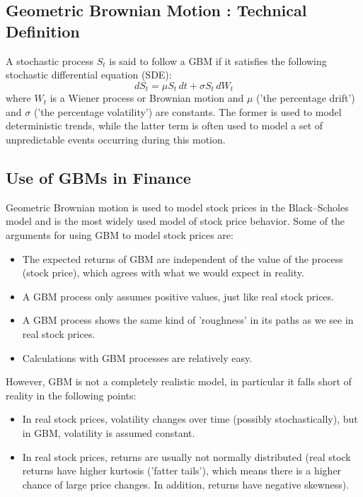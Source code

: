 \documentclass[12pt]{article}
\begin{document}
\subsection{Geometric Brownian Motion : Technical Definition}
A stochastic process $S_t$ is said to follow a GBM if it satisfies the following stochastic differential equation (SDE):
 \[dS_t = \mu S_t\,dt + \sigma S_t\,dW_t \]
where  $W_t$  is a Wiener process or Brownian motion and  $\mu$  ('the percentage drift') and  $\sigma$  ('the percentage volatility') are constants. The former is used to model deterministic trends, while the latter term is often used to model a set of unpredictable events occurring during this motion.
\subsection{Use of GBMs in Finance}
Geometric Brownian motion is used to model stock prices in the Black–Scholes model and is the most widely used model of stock price behavior.
Some of the arguments for using GBM to model stock prices are:
\begin{itemize}
\item The expected returns of GBM are independent of the value of the process (stock price), which agrees with what we would expect in reality.
\item A GBM process only assumes positive values, just like real stock prices.
\item A GBM process shows the same kind of 'roughness' in its paths as we see in real stock prices.
\item Calculations with GBM processes are relatively easy.
\end{itemize}

However, GBM is not a completely realistic model, in particular it falls short of reality in the following points:

\begin{itemize}
\item In real stock prices, volatility changes over time (possibly stochastically), but in GBM, volatility is assumed constant.
\item In real stock prices, returns are usually not normally distributed (real stock returns have higher kurtosis ('fatter tails'), which means there is a higher chance of large price changes. In addition, returns have negative skewness).
\end{itemize}
\end{document}
